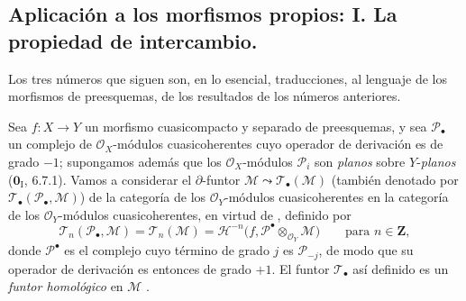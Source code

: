 \subsection{Aplicación a los morfismos propios: I. La propiedad de intercambio.}
\label{subsection:III.7.7.fr}

Los tres números que siguen son, en lo esencial, traducciones, al
lenguaje de los morfismos de preesquemas, de los resultados de los números anteriores.

\begin{env}[7.7.1]
\label{III.7.7.1}
Sea $f:X\to Y$ un morfismo cuasicompacto y separado de preesquemas, y sea
$\mathscr P_\bullet$ un complejo de $\mathscr O_X$-módulos cuasicoherentes cuyo
operador de derivación es de grado $-1$; supongamos además que los
$\mathscr O_X$-módulos $\mathscr P_i$ son \emph{planos} sobre $Y$-\emph{planos} ($\mathbf{0}_{\mathrm I}$, 6.7.1).
Vamos a considerar el $\partial$-funtor
$\mathscr M\leadsto\mathscr T_\bullet(\mathscr M)$ (también denotado por
$\mathscr T_\bullet(\mathscr P_\bullet,\mathscr M)$) de la categoría de los
$\mathscr O_Y$-módulos cuasicoherentes en la categoría de los
$\mathscr O_Y$-módulos cuasicoherentes, en virtud de , definido
por
\[
  \mathscr T_n(\mathscr P_\bullet,\mathscr M)
  =\mathscr T_n(\mathscr M)
  =\mathscr H^{-n}
    \bigl(f,\mathscr P^\bullet\otimes_{\mathscr O_Y}\mathscr M\bigr)
  \qquad\text{para }n\in\mathbf Z,
  \tag{7.7.1.1}\label{III.7.7.1.1.fr}
\]
donde $\mathscr P^\bullet$ es el complejo cuyo término de grado $j$ es
$\mathscr P_{-j}$, de modo que su operador de derivación es entonces de grado
$+1$. El funtor $\mathscr T_\bullet$ así definido es un \emph{funtor
homológico} en $\mathscr M$ .
\end{env}

